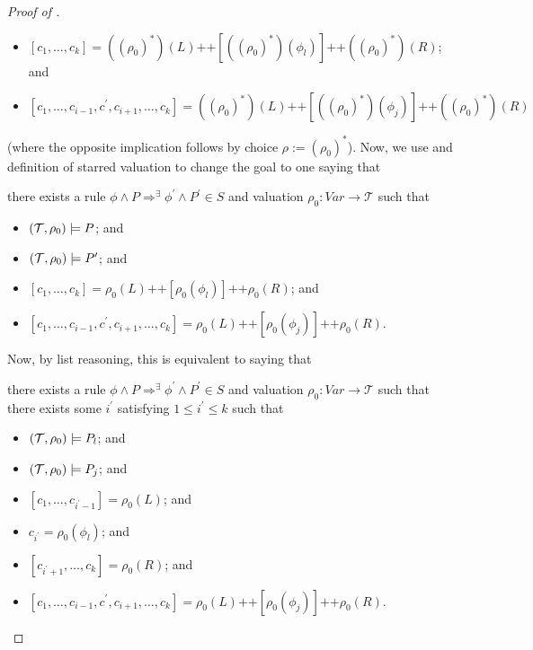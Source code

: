 \begin{proof}[Proof of ]
\begin{proofenv}
\begin{itemize}
    \item $[c_1,\ldots,c_k] = ((\rho_0)^*)(L) \texttt{++} [((\rho_0)^*)(\phi_l)] \texttt{++} ((\rho_0)^*)(R)$; and
    \item $[c_1, \ldots, c_{i-1}, c^\prime, c_{i+1}, \ldots, c_k] = ((\rho_0)^*)(L)
    \texttt{++} [((\rho_0)^*)(\phi_j)] 
    \texttt{++} ((\rho_0)^*)(R)$
\end{itemize}
\end{proofenv}
(where the opposite implication follows by choice $\rho := (\rho_0)^*$).
Now, we use  and definition of starred valuation to change the goal to one saying that
\begin{proofenv}
there exists a rule $\phi \land P \Rightarrow^\exists \phi^\prime \land P^\prime \in S$
and valuation $\rho_0 : \mathit{Var} \to \mathcal{T}$ such that
\begin{itemize}
    \item $(\mathcal{T}, \rho_0) \models P$; and
    \item $(\mathcal{T}, \rho_0) \models P^\prime$; and
    \item $[c_1,\ldots,c_k] = \rho_0(L) \texttt{++} [\rho_0(\phi_l)] \texttt{++} \rho_0(R)$; and
    \item $[c_1, \ldots, c_{i-1}, c^\prime, c_{i+1}, \ldots, c_k] = \rho_0(L)
    \texttt{++} [\rho_0(\phi_j)] 
    \texttt{++} \rho_0(R)$.
\end{itemize}
\end{proofenv}
Now, by list reasoning, this is equivalent to
saying that
\begin{proofenv}
there exists a rule $\phi \land P \Rightarrow^\exists \phi^\prime \land P^\prime \in S$
and valuation $\rho_0 : \mathit{Var} \to \mathcal{T}$ such that
there exists some $i^\prime$ satisfying $1 \leq i^\prime \leq k$
such that
\begin{itemize}
    \item $(\mathcal{T}, \rho_0) \models P_l$; and
    \item $(\mathcal{T}, \rho_0) \models P_j$; and
    \item $[c_1,\ldots, c_{i^\prime-1}] = \rho_0(L)$; and
    \item $c_{i^\prime} = \rho_0(\phi_l)$; and
    \item $[c_{i^\prime+1},\ldots,c_k] = \rho_0(R)$; and
    \item $[c_1, \ldots, c_{i-1}, c^\prime, c_{i+1}, \ldots, c_k] = \rho_0(L)
    \texttt{++} [\rho_0(\phi_j)] 
    \texttt{++} \rho_0(R)$.
\end{itemize}

\end{proofenv}
\end{proof}
